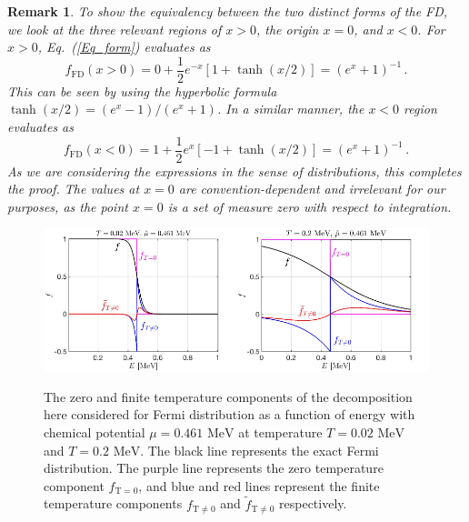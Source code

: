 \documentclass[sn-mathphys,Numbered]{sn-jnl}
\newcommand{\req}[1]{Eq.~(\ref{#1})}
\newcommand*{\MeV}{\text{ MeV}}
\newcommand{\rev}[1]{{\color{blue}#1}}
\newtheorem{remark}{Remark}
\begin{document}
\begin{remark}
To show the equivalency between the two distinct forms of the FD, we look at the three relevant regions of $x>0$, the origin $x=0$, and $x<0$. For $x>0$, \req{Eq_form} evaluates as
\begin{equation}\label{eq:xpos}
     f_\mathrm{FD}(x>0) = 0 + \frac{1}{2}e^{-x}[1+\tanh(x/2)] = (e^x + 1)^{-1}\,.
 \end{equation}
 This can be seen by using the hyperbolic formula $\tanh(x/2)=(e^x-1)/(e^x+1)$. In a similar manner, the $x<0$ region evaluates as
 \begin{equation}\label{eq:xneg}
     f_\mathrm{FD}(x<0) = 1 + \frac{1}{2}e^{x}[-1 + \tanh(x/2)] = (e^x + 1)^{-1}\,.
 \end{equation}
 As we are considering the expressions in the sense of distributions, this completes the proof.  The values at $x=0$ are convention-dependent and irrelevant for our purposes, as the point $x=0$ is a set of measure zero with respect to integration.
\end{remark}
\begin{figure}[ht]
\centering
\includegraphics[width=0.5\textwidth]{./plot/FermiZeorFiniteTemperature}\includegraphics[width=0.5\textwidth]{./plot/FermiZeroFiniteTemperature002}
\caption{%
The zero and finite temperature components of the decomposition here considered for Fermi distribution as a function of energy with chemical potential $\mu=0.461\MeV$ at temperature $T=0.02\MeV$ and $T=0.2\MeV$. The black line represents the exact Fermi distribution. The purple line represents the zero temperature component $f_{\mathrm{T}=0}$, and blue and red lines represent the finite temperature components $f_\mathrm{T\neq0}$ and $\widetilde f_\mathrm{T\neq0}$ respectively. }
\label{Fermi_Component}
\end{figure}
\end{document}
